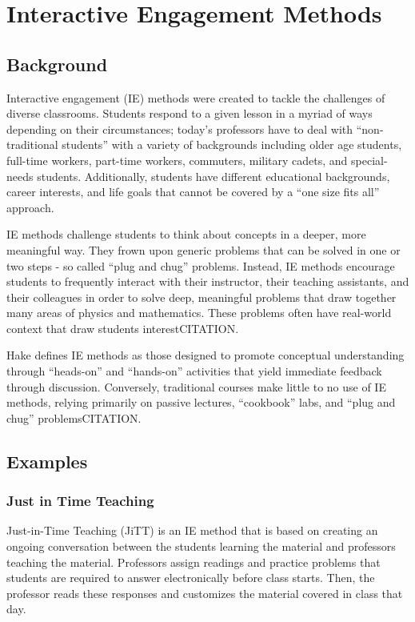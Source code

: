 \chapter[Chapter 3: Interactive Engagement Methods]{Interactive Engagement Methods}

\section{Background}

Interactive engagement (IE) methods were created to tackle the challenges of diverse classrooms. Students respond to a given lesson in a myriad of ways depending on their circumstances; today's professors have to deal with ``non-traditional students'' with a variety of backgrounds including older age students, full-time workers, part-time workers, commuters, military cadets, and special-needs students. Additionally, students have different educational backgrounds, career interests, and life goals that cannot be covered by a ``one size fits all'' approach\cite{novak1999}.

IE methods challenge students to think about concepts in a deeper, more meaningful way. They frown upon generic problems that can be solved in one or two steps - so called ``plug and chug'' problems. Instead, IE methods encourage students to frequently interact with their instructor, their teaching assistants, and their colleagues in order to solve deep, meaningful problems that draw together many areas of physics and mathematics. These problems often have real-world context that draw students interestCITATION.

Hake defines IE methods as those designed to promote conceptual understanding through ``heads-on'' and ``hands-on'' activities that yield immediate feedback through discussion. Conversely, traditional courses make little to no use of IE methods, relying primarily on passive lectures, ``cookbook'' labs, and ``plug and chug'' problemsCITATION.

\section{Examples}

\subsection{Just in Time Teaching}

Just-in-Time Teaching (JiTT) is an IE method that is based on creating an ongoing conversation between the students learning the material and professors teaching the material. Professors assign readings and practice problems that students are required to answer electronically before class starts. Then, the professor reads these responses and customizes the material covered in class that day\cite{novak1999}.

